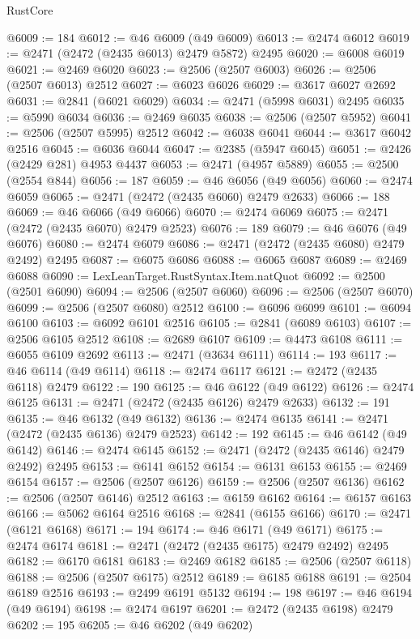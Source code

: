 \begin{lexlean}{RustCore}
\begin{coremodule}
@6009 := 184
@6012 := @46 @6009 (@49 @6009)
@6013 := @2474 @6012
@6019 := @2471 (@2472 (@2435 @6013) @2479 @5872) @2495
@6020 := @6008 @6019
@6021 := @2469 @6020
@6023 := @2506 (@2507 @6003)
@6026 := @2506 (@2507 @6013) @2512
@6027 := @6023 @6026
@6029 := @3617 @6027 @2692
@6031 := @2841 (@6021 @6029)
@6034 := @2471 (@5998 @6031) @2495
@6035 := @5990 @6034
@6036 := @2469 @6035
@6038 := @2506 (@2507 @5952)
@6041 := @2506 (@2507 @5995) @2512
@6042 := @6038 @6041
@6044 := @3617 @6042 @2516
@6045 := @6036 @6044
@6047 := @2385 (@5947 @6045)
@6051 := @2426 (@2429 @281) @4953 @4437
@6053 := @2471 (@4957 @5889)
@6055 := @2500 (@2554 @844)
@6056 := 187
@6059 := @46 @6056 (@49 @6056)
@6060 := @2474 @6059
@6065 := @2471 (@2472 (@2435 @6060) @2479 @2633)
@6066 := 188
@6069 := @46 @6066 (@49 @6066)
@6070 := @2474 @6069
@6075 := @2471 (@2472 (@2435 @6070) @2479 @2523)
@6076 := 189
@6079 := @46 @6076 (@49 @6076)
@6080 := @2474 @6079
@6086 := @2471 (@2472 (@2435 @6080) @2479 @2492) @2495
@6087 := @6075 @6086
@6088 := @6065 @6087
@6089 := @2469 @6088
@6090 := LexLeanTarget.RustSyntax.Item.natQuot
@6092 := @2500 (@2501 @6090)
@6094 := @2506 (@2507 @6060)
@6096 := @2506 (@2507 @6070)
@6099 := @2506 (@2507 @6080) @2512
@6100 := @6096 @6099
@6101 := @6094 @6100
@6103 := @6092 @6101 @2516
@6105 := @2841 (@6089 @6103)
@6107 := @2506 @6105 @2512
@6108 := @2689 @6107
@6109 := @4473 @6108
@6111 := @6055 @6109 @2692
@6113 := @2471 (@3634 @6111)
@6114 := 193
@6117 := @46 @6114 (@49 @6114)
@6118 := @2474 @6117
@6121 := @2472 (@2435 @6118) @2479
@6122 := 190
@6125 := @46 @6122 (@49 @6122)
@6126 := @2474 @6125
@6131 := @2471 (@2472 (@2435 @6126) @2479 @2633)
@6132 := 191
@6135 := @46 @6132 (@49 @6132)
@6136 := @2474 @6135
@6141 := @2471 (@2472 (@2435 @6136) @2479 @2523)
@6142 := 192
@6145 := @46 @6142 (@49 @6142)
@6146 := @2474 @6145
@6152 := @2471 (@2472 (@2435 @6146) @2479 @2492) @2495
@6153 := @6141 @6152
@6154 := @6131 @6153
@6155 := @2469 @6154
@6157 := @2506 (@2507 @6126)
@6159 := @2506 (@2507 @6136)
@6162 := @2506 (@2507 @6146) @2512
@6163 := @6159 @6162
@6164 := @6157 @6163
@6166 := @5062 @6164 @2516
@6168 := @2841 (@6155 @6166)
@6170 := @2471 (@6121 @6168)
@6171 := 194
@6174 := @46 @6171 (@49 @6171)
@6175 := @2474 @6174
@6181 := @2471 (@2472 (@2435 @6175) @2479 @2492) @2495
@6182 := @6170 @6181
@6183 := @2469 @6182
@6185 := @2506 (@2507 @6118)
@6188 := @2506 (@2507 @6175) @2512
@6189 := @6185 @6188
@6191 := @2504 @6189 @2516
@6193 := @2499 @6191 @5132
@6194 := 198
@6197 := @46 @6194 (@49 @6194)
@6198 := @2474 @6197
@6201 := @2472 (@2435 @6198) @2479
@6202 := 195
@6205 := @46 @6202 (@49 @6202)

\end{coremodule}
\end{lexlean}
